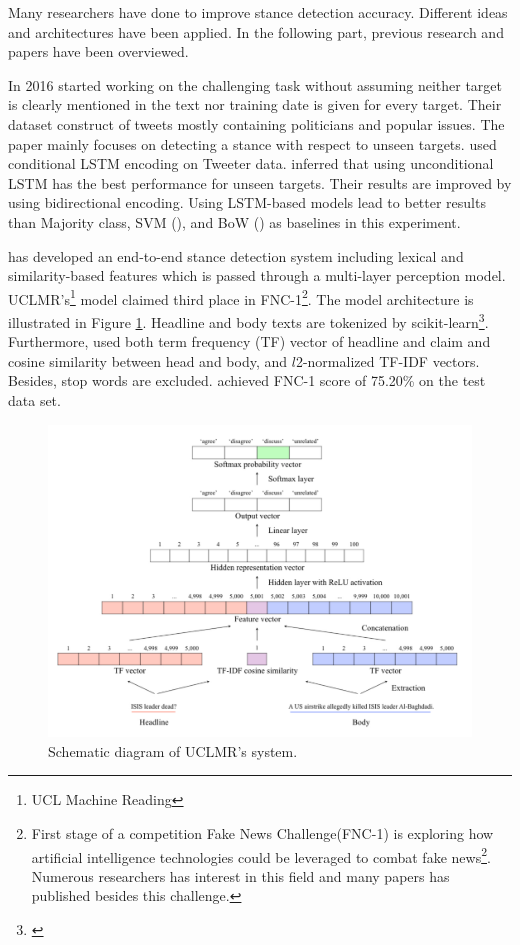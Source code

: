 Many researchers have done to improve stance detection accuracy. Different ideas and architectures have been applied. In the following part, previous research and papers have been overviewed.  

In 2016 \cite{Augenstein2016StanceDW} started working on the challenging task without assuming neither target is clearly mentioned in the text nor training date is given for every target. Their dataset construct of tweets mostly containing politicians and popular issues. The paper mainly focuses on detecting a stance with respect to unseen targets. \cite{Augenstein2016StanceDW} used conditional LSTM encoding on Tweeter data. \cite{Augenstein2016StanceDW} inferred that using unconditional LSTM has the best performance for unseen targets. Their results are improved by using bidirectional encoding. Using LSTM-based models lead to better results than Majority class, SVM (\cite{svc}), and BoW (\cite{bow}) as baselines in this experiment.

\cite{UCLMR} has developed an end-to-end stance detection system including lexical and similarity-based features which is passed through a multi-layer perception model. UCLMR's\footnote{UCL Machine Reading} model claimed third place in FNC-1\footnote{First stage of a competition Fake News Challenge(FNC-1) is exploring how artificial intelligence technologies could be leveraged to combat fake news\footnote{fakenewschallenge.org}. Numerous researchers has interest in this field and many papers has published besides this challenge.}. The model architecture is illustrated in Figure \ref{fig:UCLMR-system}. Headline and body texts are tokenized by scikit-learn\footnote{\cite{sikit-learn}}. Furthermore, \cite{UCLMR} used both term frequency (TF) vector of headline and claim and cosine similarity between head and body, and $l$2-normalized TF-IDF vectors. Besides, stop words are excluded. \cite{UCLMR} achieved FNC-1 score of 75.20\% on the test data set.
\begin{figure}
	\centering
	\includegraphics[scale=0.4]{statistics/stance/simple-baseline-FNC.png}
	\caption{Schematic diagram of UCLMR’s system.}
	\label{fig:UCLMR-system}
\end{figure}


